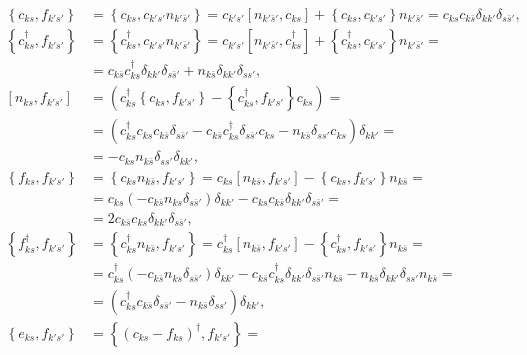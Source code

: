 \documentclass[english, parskip=full]{scrartcl}
\newcommand{\kla}{}
\newcommand{\klam}{}
\newcommand{\klammer}{}
\begin{document}
\begin{align}
\klammer\left\{ c_{ks}, f_{k's'} \right\} &= \klammer\left\{ c_{ks}, c_{k's'} n_{k'\bar{s}'} \right\} = c_{k's'} \klam\left[ n_{k'\bar{s}'}, c_{ks} \right] + \klammer\left\{ c_{ks}, c_{k's'} \right\} n_{k'\bar{s}'} = c_{ks}c_{k\bar{s}} \delta_{kk'} \delta_{s\bar{s}'}, \\
\klammer\left\{ c_{ks}^\dagger, f_{k's'} \right\} &= \klammer\left\{ c_{ks}^\dagger, c_{k's'} n_{k'\bar{s}'} \right\} = c_{k's'} \klam\left[ n_{k'\bar{s}'}, c_{ks}^\dagger \right] + \klammer\left\{ c_{ks}^\dagger, c_{k's'} \right\} n_{k'\bar{s}'} = \\
&= c_{k\bar{s}} c_{ks}^\dagger \delta_{kk'} \delta_{s\bar{s}'} + n_{k\bar{s}} \delta_{kk'} \delta_{ss'}, \\
\left[ n_{ks}, f_{k's'} \right] &= \left( c_{ks}^\dagger \klammer\left\{ c_{ks}, f_{k's'} \right\} - \klammer\left\{ c_{ks}^\dagger, f_{k's'} \right\} c_{ks} \right) = \\
&= \kla\left( c_{ks}^\dagger c_{ks}c_{k\bar{s}} \delta_{s\bar{s}'} - c_{k\bar{s}} c_{ks}^\dagger \delta_{s\bar{s}'} c_{ks} - n_{k\bar{s}} \delta_{ss'} c_{ks}  \right) \delta_{kk'} = \\
&= -c_{ks} n_{k\bar{s}} \delta_{ss'} \delta_{kk'} ,\\
\klammer\left\{ f_{ks}, f_{k's'} \right\} &= \klammer\left\{ c_{ks} n_{k\bar{s}}, f_{k's'} \right\} = c_{ks} \klam\left[ n_{k\bar{s}}, f_{k's'} \right] - \klammer\left\{ c_{ks}, f_{k's'} \right\} n_{k\bar{s}} = \\
&= c_{ks} \left( - c_{k\bar{s}} n_{ks} \delta_{s\bar{s}'} \right) \delta_{kk'} - c_{ks}c_{k\bar{s}} \delta_{kk'} \delta_{s\bar{s}'} = \\
&= 2c_{k\bar{s}} c_{ks} \delta_{kk'} \delta_{s\bar{s}'},\\
\klammer\left\{ f_{ks}^\dagger, f_{k's'} \right\} &= \klammer\left\{ c_{ks}^\dagger n_{k\bar{s}} , f_{k's'} \right\} = c_{ks}^\dagger \klam\left[ n_{k\bar{s}}, f_{k's'} \right] - \klammer\left\{ c_{ks}^\dagger, f_{k's'} \right\} n_{k\bar{s}} = \\
&= c_{ks}^\dagger \left( -c_{k\bar{s}} n_{ks} \delta_{s\bar{s}'} \right) \delta_{kk'} - c_{k\bar{s}} c_{ks}^\dagger \delta_{kk'} \delta_{s\bar{s}'} n_{k\bar{s}} - n_{k\bar{s}} \delta_{kk'} \delta_{ss'} n_{k\bar{s}} = \\
&= \kla\left( c_{ks}^\dagger c_{k\bar{s}} \delta_{s\bar{s}'} - n_{k\bar{s}} \delta_{ss'} \right) \delta_{kk'}, \\
\klammer\left\{ e_{ks}, f_{k's'} \right\} &= \klammer\left\{ \kla\left( c_{ks} - f_{ks} \right)^\dagger, f_{k's'} \right\} = \\

\end{align}
\end{document}
